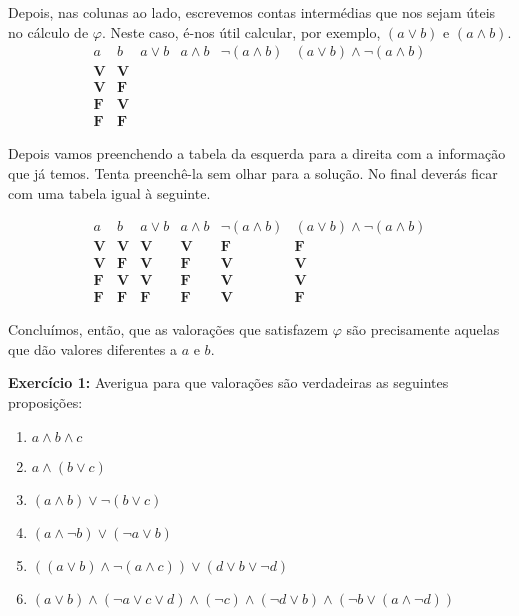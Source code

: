 \documentclass{article}
\theoremstyle{definition}
\theoremstyle{remark}
\newcommand{\V}{\mathbf{V}}
\newcommand{\F}{\mathbf{F}}
\begin{document}
	Depois, nas colunas ao lado, escrevemos contas intermédias que nos sejam úteis no cálculo de $\varphi$. Neste caso, é-nos útil calcular, por exemplo, $(a \lor b)$ e $(a \land b)$.
	\[
	\begin{array}{c|c|c|c|c|c}
	a & b & a \lor b & a \land b & \neg (a \land b) & (a \lor b) \land \neg (a \land b)\\
	\hline
	\V & \V &&&\\
	\V & \F &&&\\
	\F & \V &&&\\
	\F & \F &&&
	\end{array}
	\]
	
	Depois vamos preenchendo a tabela da esquerda para a direita com a informação que já temos. Tenta preenchê-la sem olhar para a solução. No final deverás ficar com uma tabela igual à seguinte.
	
	\[
	\begin{array}{c|c|c|c|c|c}
	a & b & a \lor b & a \land b & \neg (a \land b) & (a \lor b) \land \neg (a \land b)\\
	\hline
	\V & \V &\V&\V&\F&\F\\
	\V & \F &\V&\F&\V&\V\\
	\F & \V &\V&\F&\V&\V\\
	\F & \F &\F&\F&\V&\F
	\end{array}
	\]
	
	Concluímos, então, que as valorações que satisfazem $\varphi$ são precisamente aquelas que dão valores diferentes a $a$ e $b$.
	
	\medskip
	
	\textbf{Exercício 1:} Averigua para que valorações são verdadeiras as seguintes proposições:
	
	\begin{enumerate}
	\item $a \land b \land c$
	
	\item $a \land (b \lor c)$
	
	\item $(a \land b) \lor \neg (b \lor c)$
	
	\item $(a \land \neg b) \lor (\neg a \lor b)$
	
	\item $((a \lor b) \land \neg (a \land c)) \lor (d \lor b \lor \neg d)$
	
	\item $(a \lor b) \land (\neg a \lor c \lor d) \land (\neg c) \land (\neg d \lor b) \land (\neg b \lor (a \land \neg d))$
	\end{enumerate}
	
\end{document}

